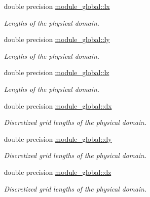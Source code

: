 \textbf{ }\par
\begin{DoxyCompactItemize}
\item 
double precision \mbox{\hyperlink{namespacemodule__global_a6ec7be7ac910713bd6e534fdf4f035f6}{module\+\_\+global\+::lx}}
\begin{DoxyCompactList}\small\item\em Lengths of the physical domain. \end{DoxyCompactList}\item 
double precision \mbox{\hyperlink{namespacemodule__global_aea3b69a2a192a66afaa68c23a41a4c04}{module\+\_\+global\+::ly}}
\begin{DoxyCompactList}\small\item\em Lengths of the physical domain. \end{DoxyCompactList}\item 
double precision \mbox{\hyperlink{namespacemodule__global_a6634b2eeafed254b5e008f5f0c8d2660}{module\+\_\+global\+::lz}}
\begin{DoxyCompactList}\small\item\em Lengths of the physical domain. \end{DoxyCompactList}\end{DoxyCompactItemize}

\textbf{ }\par
\begin{DoxyCompactItemize}
\item 
double precision \mbox{\hyperlink{namespacemodule__global_ac9f59881b3d1a132a79c38005a3327b0}{module\+\_\+global\+::dx}}
\begin{DoxyCompactList}\small\item\em Discretized grid lengths of the physical domain. \end{DoxyCompactList}\item 
double precision \mbox{\hyperlink{namespacemodule__global_ad57f0245662462006b209450d8d16e06}{module\+\_\+global\+::dy}}
\begin{DoxyCompactList}\small\item\em Discretized grid lengths of the physical domain. \end{DoxyCompactList}\item 
double precision \mbox{\hyperlink{namespacemodule__global_ac6cde152bc0a2bd48b727bfe326c68ff}{module\+\_\+global\+::dz}}
\begin{DoxyCompactList}\small\item\em Discretized grid lengths of the physical domain. \end{DoxyCompactList}\end{DoxyCompactItemize}



